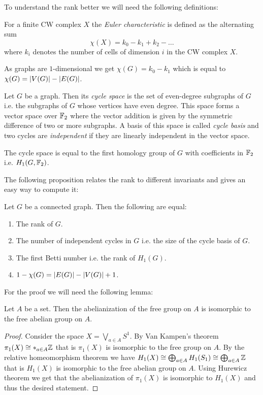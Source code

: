 To understand the rank better we will need the following definitions:
\begin{definition}
	For a finite CW complex $X$ the \emph{Euler characteristic} is defined as the alternating sum
	\[
		\chi(X) = k_0 - k_1 + k_2 - \ldots
	\] 
	where $k_{i}$ denotes the number of cells of dimension $i$ in the CW complex $X$.
\end{definition}
As graphs are $1$-dimensional we get $\chi (G) = k_0 - k_1$ which is equal to $\chi(G) = \abs{V(G)} - \abs{E(G)}$.

\begin{definition}
	Let $G$ be a graph. Then its \emph{cycle space} is the set of even-degree subgraphs of $G$ i.e. the subgraphs of $G$ whose vertices have even degree. 
	This space forms a vector space over $\mathbb{F}_2$ where the vector addition is given by the symmetric difference of two or more subgraphs.
	A basis of this space is called \emph{cycle basis} and two cycles are \emph{independent} if they are linearly independent in the vector space.
\end{definition}

\begin{remark}
	The cycle space is equal to the first homology group of $G$ with coefficients in $\mathbb{F}_2$ i.e. $H_1(G,\mathbb{F}_2)$.
\end{remark}

The following proposition relates the rank to different invariants and gives an easy way to compute it: 
\begin{proposition}\label{prop:rank}
	Let $G$ be a connected graph. Then the following are equal:
	\begin{enumerate}
		\item The rank of $G$.
		\item The number of independent cycles in $G$ i.e. the size of the cycle basis of $G$.
		\item The first Betti number i.e. the rank of $H_{1}(G)$.
		\item $1 - \chi(G) = \abs{E(G)} - \abs{V(G)} + 1$.
	\end{enumerate}
\end{proposition}

For the proof we will need the following lemma:
\begin{lemma}
	Let $A$ be a set. Then the abelianization of the free group on $A$ is isomorphic to the free abelian group on $A$.
\end{lemma}

\begin{proof}
	Consider the space $X = \bigvee_{a \in A} S^{1}$. By Van Kampen's theorem $\pi_1(X) \cong *_{a \in A} \mathbb{Z}$ that is $\pi_1(X)$ is isomorphic to the free group on $A$.
	By the relative homeomorphism theorem we have $H_1(X) \cong \bigoplus_{a \in A} H_1(S_1) \cong \bigoplus_{a \in A} \mathbb{Z}$ 
	that is $H_1(X)$ is isomorphic to the free abelian group on $A$.
	Using Hurewicz theorem we get that the abelianization of $\pi_1(X)$ is isomorphic to $H_1(X)$ and thus the desired statement.
\end{proof}

